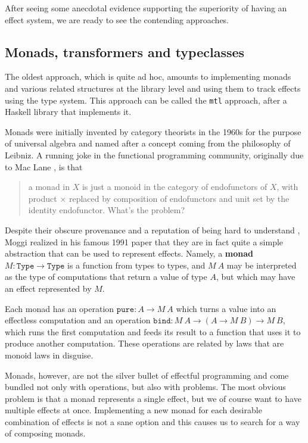 \documentclass[declaration,inz,english,shortabstract]{iithesis}
\newcommand{\m}[1]{\texttt{#1}}
\newcommand{\Type}{\texttt{Type}}
\begin{document}
After seeing some anecdotal evidence supporting the superiority of having an effect system, we are ready to see the contending approaches.

\subsection{Monads, transformers and typeclasses}

The oldest approach, which is quite ad hoc, amounts to implementing monads and various related structures at the library level and using them to track effects using the type system. This approach can be called the \m{mtl} approach, after a Haskell library that implements it.

Monads were initially invented by category theorists in the 1960s for the purpose of universal algebra and named after a concept coming from the philosophy of Leibniz. A running joke in the functional programming community, originally due to Mac Lane \cite{CWM}, is that

\begin{quote}
    a monad in $X$ is just a monoid in the category of endofunctors of $X$, with product $\times$ replaced by composition of endofunctors and unit set by the identity endofunctor. What's the problem?
\end{quote}

Despite their obscure provenance and a reputation of being hard to understand \cite{MonadTutorialFallacy}, Moggi realized in his famous 1991 paper \cite{Moggi} that they are in fact quite a simple abstraction that can be used to represent effects. Namely, a \textbf{monad} $M : \Type \to \Type$ is a function from types to types, and $M\ A$ may be interpreted as the type of computations that return a value of type $A$, but which may have an effect represented by $M$.

Each monad has an operation $\m{pure} : A \to M\ A$ which turns a value into an effectless computation and an operation $\m{bind} : M\ A \to (A \to M\ B) \to M\ B$, which runs the first computation and feeds its result to a function that uses it to produce another computation. These operations are related by laws that are monoid laws in disguise.

Monads, however, are not the silver bullet of effectful programming and come bundled not only with operations, but also with problems. The most obvious problem is that a monad represents a single effect, but we of course want to have multiple effects at once. Implementing a new monad for each desirable combination of effects is not a sane option and this causes us to search for a way of composing monads.
\end{document}
